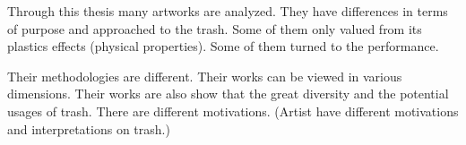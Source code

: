 












%
%
Through this thesis many artworks are analyzed. They have differences in terms of purpose and approached to the trash. Some of them only valued from its plastics effects (physical properties). Some of them turned to the performance. 

Their methodologies are different. Their works can be viewed in various dimensions. Their works are also show that the great diversity and the potential usages of trash. There are different motivations. (Artist have different motivations and interpretations on trash.)

